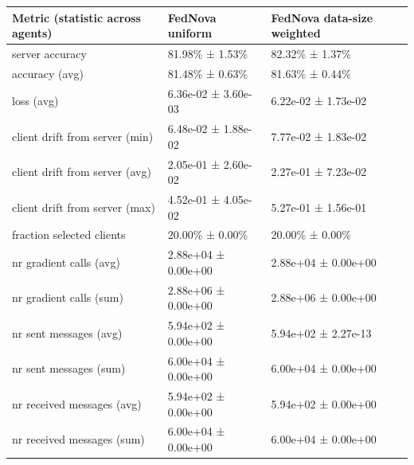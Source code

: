 \begin{tabular}{lll}
\hline
 Metric (statistic across agents)   & FedNova uniform     & FedNova data-size weighted   \\
\hline
 server accuracy                    & 81.98\% ± 1.53\%      & 82.32\% ± 1.37\%               \\
 accuracy (avg)                     & 81.48\% ± 0.63\%      & 81.63\% ± 0.44\%               \\
 loss (avg)                         & 6.36e-02 ± 3.60e-03 & 6.22e-02 ± 1.73e-02          \\
 client drift from server (min)     & 6.48e-02 ± 1.88e-02 & 7.77e-02 ± 1.83e-02          \\
 client drift from server (avg)     & 2.05e-01 ± 2.60e-02 & 2.27e-01 ± 7.23e-02          \\
 client drift from server (max)     & 4.52e-01 ± 4.05e-02 & 5.27e-01 ± 1.56e-01          \\
 fraction selected clients          & 20.00\% ± 0.00\%      & 20.00\% ± 0.00\%               \\
 nr gradient calls (avg)            & 2.88e+04 ± 0.00e+00 & 2.88e+04 ± 0.00e+00          \\
 nr gradient calls (sum)            & 2.88e+06 ± 0.00e+00 & 2.88e+06 ± 0.00e+00          \\
 nr sent messages (avg)             & 5.94e+02 ± 0.00e+00 & 5.94e+02 ± 2.27e-13          \\
 nr sent messages (sum)             & 6.00e+04 ± 0.00e+00 & 6.00e+04 ± 0.00e+00          \\
 nr received messages (avg)         & 5.94e+02 ± 0.00e+00 & 5.94e+02 ± 0.00e+00          \\
 nr received messages (sum)         & 6.00e+04 ± 0.00e+00 & 6.00e+04 ± 0.00e+00          \\
\hline
\end{tabular}